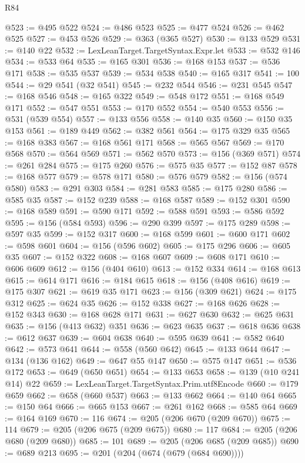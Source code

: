 \begin{lexlean}{R84}
\begin{coremodule}
@523 := @495 @522
@524 := @486 @523
@525 := @477 @524
@526 := @462 @525
@527 := @453 @526
@529 := @363 (@365 @527)
@530 := @133 @529
@531 := @140 @22
@532 := LexLeanTarget.TargetSyntax.Expr.let
@533 := @532 @146
@534 := @533 @64
@535 := @165 @301
@536 := @168 @153
@537 := @536 @171
@538 := @535 @537
@539 := @534 @538
@540 := @165 @317
@541 := 100
@544 := @29 @541 (@32 @541)
@545 := @232 @544
@546 := @231 @545
@547 := @168 @546
@548 := @165 @322
@549 := @548 @172
@551 := @168 @549 @171
@552 := @547 @551
@553 := @170 @552
@554 := @540 @553
@556 := @531 (@539 @554)
@557 := @133 @556
@558 := @140 @35
@560 := @150 @35 @153
@561 := @189 @449
@562 := @382 @561
@564 := @175 @329 @35
@565 := @168 @383
@567 := @168 @561 @171
@568 := @565 @567
@569 := @170 @568
@570 := @564 @569
@571 := @562 @570
@573 := @156 (@369 @571)
@574 := @261 @284
@575 := @175 @260
@576 := @575 @35
@577 := @152 @87
@578 := @168 @577
@579 := @578 @171
@580 := @576 @579
@582 := @156 (@574 @580)
@583 := @291 @303
@584 := @281 @583
@585 := @175 @280
@586 := @585 @35
@587 := @152 @239
@588 := @168 @587
@589 := @152 @301
@590 := @168 @589
@591 := @590 @171
@592 := @588 @591
@593 := @586 @592
@595 := @156 (@584 @593)
@596 := @290 @399
@597 := @175 @289
@598 := @597 @35
@599 := @152 @317
@600 := @168 @599
@601 := @600 @171
@602 := @598 @601
@604 := @156 (@596 @602)
@605 := @175 @296
@606 := @605 @35
@607 := @152 @322
@608 := @168 @607
@609 := @608 @171
@610 := @606 @609
@612 := @156 (@404 @610)
@613 := @152 @334
@614 := @168 @613
@615 := @614 @171
@616 := @184 @615
@618 := @156 (@408 @616)
@619 := @175 @307
@621 := @619 @35 @171
@623 := @156 (@309 @621)
@624 := @175 @312
@625 := @624 @35
@626 := @152 @338
@627 := @168 @626
@628 := @152 @343
@630 := @168 @628 @171
@631 := @627 @630
@632 := @625 @631
@635 := @156 (@413 @632) @351
@636 := @623 @635
@637 := @618 @636
@638 := @612 @637
@639 := @604 @638
@640 := @595 @639
@641 := @582 @640
@642 := @573 @641
@644 := @558 (@560 @642)
@645 := @133 @644
@647 := @134 (@136 @162)
@649 := @647 @55 @147
@650 := @575 @147
@651 := @536 @172
@653 := @649 (@650 @651)
@654 := @133 @653
@658 := @139 (@10 @241 @14) @22
@659 := LexLeanTarget.TargetSyntax.Prim.utf8Encode
@660 := @179 @659
@662 := @658 (@660 @537)
@663 := @133 @662
@664 := @140 @64
@665 := @150 @64
@666 := @665 @153
@667 := @261 @162
@668 := @585 @64
@669 := @164 @169
@670 := 116
@674 := @205 (@206 @670 (@209 @670))
@675 := 114
@679 := @205 (@206 @675 (@209 @675))
@680 := 117
@684 := @205 (@206 @680 (@209 @680))
@685 := 101
@689 := @205 (@206 @685 (@209 @685))
@690 := @689 @213
@695 := @201 (@204 (@674 (@679 (@684 @690))))

\end{coremodule}
\end{lexlean}

